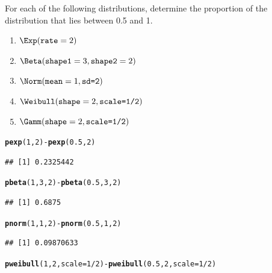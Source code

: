 \documentclass[twoside]{book}\usepackage[]{graphicx}\usepackage[]{xcolor}
\makeatletter
\newcommand{\hlnum}[1]{\textcolor[rgb]{0.686,0.059,0.569}{#1}}%
\newcommand{\hlopt}[1]{\textcolor[rgb]{0,0,0}{#1}}%
\newcommand{\hlstd}[1]{\textcolor[rgb]{0.345,0.345,0.345}{#1}}%
\newcommand{\hlkwc}[1]{\textcolor[rgb]{0.333,0.667,0.333}{#1}}%
\newcommand{\hlkwd}[1]{\textcolor[rgb]{0.737,0.353,0.396}{\textbf{#1}}}%
\newenvironment{kframe}{%
 \def\at@end@of@kframe{}%
 \ifinner\ifhmode%
  \def\at@end@of@kframe{\end{minipage}}%
  \begin{minipage}{\columnwidth}%
 \fi\fi%
 \def\FrameCommand##1{\hskip\@totalleftmargin \hskip-\fboxsep
 \colorbox{shadecolor}{##1}\hskip-\fboxsep
     \hskip-\linewidth \hskip-\@totalleftmargin \hskip\columnwidth}%
 \MakeFramed {\advance\hsize-\width
   \@totalleftmargin\z@ \linewidth\hsize
   \@setminipage}}%
 {\par\unskip\endMakeFramed%
 \at@end@of@kframe}
\newenvironment{knitrout}{}{} %
\makeatother
\begin{document}
\begin{problem}
	For each of the following distributions, determine the proportion 
	of the distribution that lies between 0.5 and 1.
	\begin{enumerate}
		\item
			$\Exp(\texttt{rate} = 2)$
		\item
			$\Beta(\texttt{shape1} = 3, \texttt{shape2}=2)$
		\item
			$\Norm(\texttt{mean} = 1, \texttt{sd=2})$
		\item
			$\Weibull(\texttt{shape} = 2, \texttt{scale=1/2})$
		\item
			$\Gamm(\texttt{shape} = 2, \texttt{scale=1/2})$
	\end{enumerate}
\end{problem}

\begin{solution}
\begin{knitrout}
\color{fgcolor}\begin{kframe}
\begin{alltt}
\hlkwd{pexp}\hlstd{(}\hlnum{1}\hlstd{,} \hlnum{2}\hlstd{)} \hlopt{-} \hlkwd{pexp}\hlstd{(}\hlnum{0.5}\hlstd{,} \hlnum{2}\hlstd{)}
\end{alltt}
\begin{verbatim}
## [1] 0.2325442
\end{verbatim}
\begin{alltt}
\hlkwd{pbeta}\hlstd{(}\hlnum{1}\hlstd{,} \hlnum{3}\hlstd{,} \hlnum{2}\hlstd{)} \hlopt{-} \hlkwd{pbeta}\hlstd{(}\hlnum{0.5}\hlstd{,} \hlnum{3}\hlstd{,} \hlnum{2}\hlstd{)}
\end{alltt}
\begin{verbatim}
## [1] 0.6875
\end{verbatim}
\begin{alltt}
\hlkwd{pnorm}\hlstd{(}\hlnum{1}\hlstd{,} \hlnum{1}\hlstd{,} \hlnum{2}\hlstd{)} \hlopt{-} \hlkwd{pnorm}\hlstd{(}\hlnum{0.5}\hlstd{,} \hlnum{1}\hlstd{,} \hlnum{2}\hlstd{)}
\end{alltt}
\begin{verbatim}
## [1] 0.09870633
\end{verbatim}
\begin{alltt}
\hlkwd{pweibull}\hlstd{(}\hlnum{1}\hlstd{,} \hlnum{2}\hlstd{,} \hlkwc{scale} \hlstd{=} \hlnum{1}\hlopt{/}\hlnum{2}\hlstd{)} \hlopt{-} \hlkwd{pweibull}\hlstd{(}\hlnum{0.5}\hlstd{,} \hlnum{2}\hlstd{,} \hlkwc{scale} \hlstd{=} \hlnum{1}\hlopt{/}\hlnum{2}\hlstd{)}
\end{alltt}

\end{kframe}
\end{knitrout}
\end{solution}
\end{document}
